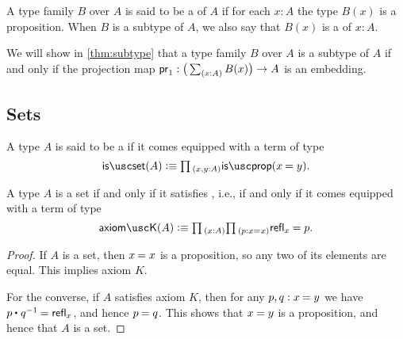 \begin{defn}
A type family $B$ over $A$ is said to be a  of $A$ if for each $x:A$ the type $B(x)$ is a proposition. When $B$ is a subtype of $A$, we also say that $B(x)$ is a  of $x:A$.
\end{defn}

We will show in \cref{thm:subtype} that a type family $B$ over $A$ is a subtype of $A$ if and only if the projection map $\proj 1:\big(\sm{x:A}B(x)\big)\to A$ is an embedding.


\subsection{Sets}

\begin{defn}
  A type $A$ is said to be a  if it comes equipped with a term of type
\begin{equation*}
\isset(A)\defeq \prd{x,y:A}\isprop(\id{x}{y}).
\end{equation*}
\end{defn}

\begin{lem}
A type $A$ is a set if and only if it satisfies , i.e., if and only if it comes equipped with a term of type
\begin{equation*}
\axiomK(A)\defeq\prd{x:A}\prd{p:\id{x}{x}}\id{\refl{x}}{p}.
\end{equation*}
\end{lem}

\begin{proof}
If $A$ is a set, then $\id{x}{x}$ is a proposition, so any two of its elements are equal. 
This implies axiom $K$. 

For the converse, if $A$ satisfies axiom $K$, then for any $p,q:\id{x}{y}$ we have $\id{\ct{p}{q^{-1}}}{\refl{x}}$, and hence $\id{p}{q}$. This shows that $\id{x}{y}$ is a proposition, and hence that $A$ is a set.
\end{proof}

